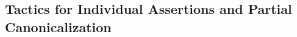\documentclass[runningheads]{llncs}
\newcommand\fstar{F$^\star$\xspace}
\newcommand\metafstar{Meta-F$^\star$\xspace}
\newcommand{\comm}[3]{\ifcheckpagebudget\else\ifdraft{{\color{#1}[#2: #3]}}\fi\fi}
\newcommand{\guido}[1]{\comm{blue}{Guido}{#1}}
\begin{document}



\subsection{Tactics for Individual Assertions and Partial Canonicalization}
\label{sec:non-linear}
\end{document}
